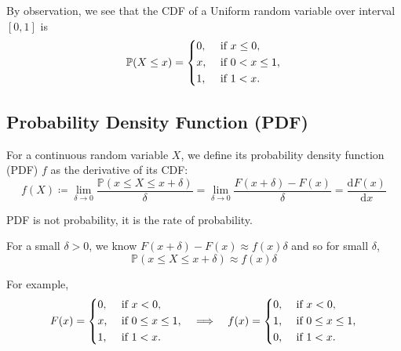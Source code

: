 By observation, we see that the CDF of a Uniform random variable over interval \([0, 1]\) is 
\[
    \mathbb{P}(X \leq x) = \begin{dcases}
        0, &\text{ if } x \leq 0 ,\\
        x, &\text{ if } 0 < x \leq 1 ,\\
        1, &\text{ if } 1 < x.
    \end{dcases}
\]

\subsection{Probability Density Function (PDF)}
\begin{definition}
    For a continuous random variable \(X\), we define its probability density function (PDF) \(f\) as the derivative of its CDF:
    \[
        f(X) \coloneqq \lim_{\delta \to 0} \dfrac{\mathbb{P}(x \leq X \leq x + \delta)}{\delta}= \lim_{\delta \to 0} \dfrac{F(x + \delta) - F(x)}{\delta} = \frac{\mathrm{d}F(x)}{\mathrm{d}x}  
    \]

    \begin{remark}
        PDF is not probability, it is the rate of probability. 
    \end{remark}
\end{definition}

For a small \(\delta > 0\), we know \(F(x + \delta) - F(x) \approx f(x)\delta\) and so for small \(\delta \), 
\[
    \mathbb{P}(x \leq X \leq x + \delta) \approx f(x)\delta
\]

For example, 
\[
    F(x) = \begin{dcases}
        0, &\text{ if } x < 0 ,\\
        x, &\text{ if } 0 \leq  x \leq 1 ,\\
        1, &\text{ if } 1 < x.
    \end{dcases}
    \quad\Longrightarrow\quad 
    f(x) = \begin{dcases}
        0, &\text{ if } x < 0 ,\\
        1, &\text{ if } 0 \leq x \leq 1 ,\\
        0, &\text{ if } 1 < x.
    \end{dcases}
\]

